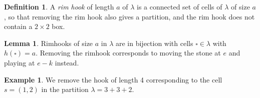 \documentclass{amsart}[12pt]
\theoremstyle{definition}
\newtheorem{lemma}[dummy]{Lemma}
\newtheorem{example}[dummy]{Example}
\newtheorem{definition}[dummy]{Definition}
\begin{document}
\begin{definition} \label{def:rimhook} A \emph{rim hook} of length $a$ of $\lambda$ is a connected set of cells of $\lambda$ of size $a$, so that removing the rim hook also gives a partition, and the rim hook does not contain a $2\times 2$ box.  
\end{definition}
  
\begin{lemma} \label{lem:rimhooks}
Rimhooks of size $a$ in $\lambda$ are in bijection with cells $\square\in\lambda$ with $h(\square)=a$.  Removing the rimhook corresponds to moving the stone at $e$ and playing at $e-k$ instead.
\end{lemma}

\begin{example}
We remove the hook of length 4 corresponding to the cell $s=(1,2)$ in the partition $\lambda=3+3+2$.



\end{example}
\end{document}
